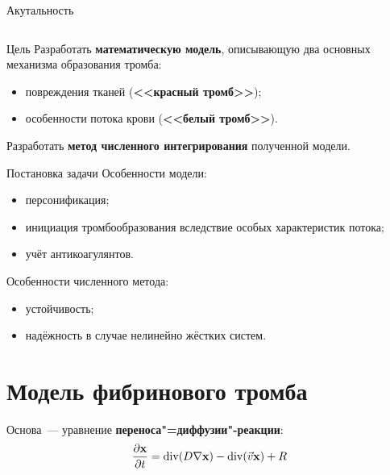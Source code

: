 \documentclass[
    14pt,
    xcolor=dvipsnames,
    aspectratio=169
]{beamer}
\begin{document}
\begin{frame}{Акутальность}
\begin{columns}[T]
\begin{column}{0.5\textwidth}
        \end{column}
    \end{columns}
\end{frame}

\begin{frame}{Цель}
    Разработать \textbf{математическую модель}, описывающую два основных механизма образования тромба:
    \begin{itemize}
        \item повреждения тканей (\textbf{<<красный тромб>>});
        \item особенности потока крови (\textbf{<<белый тромб>>}).
    \end{itemize}

    Разработать \textbf{метод численного интегрирования} полученной модели.
\end{frame}

\begin{frame}{Постановка задачи}
    Особенности модели:
    \begin{itemize}
        \item персонификация;
        \item инициация тромбообразования вследствие особых характеристик потока;
        \item учёт антикоагулянтов.
    \end{itemize}

    Особенности численного метода:
    \begin{itemize}
        \item устойчивость;
        \item надёжность в случае нелинейно жёстких систем.
    \end{itemize}
\end{frame}

\section{Модель фибринового тромба}

\begin{frame}{\secname}
    Основа~--- уравнение \textbf{переноса"=диффузии"-реакции}:
    \[
        \frac{\partial \mathbf{x}}{\partial t} = \mathrm{div} (D \nabla \mathbf{x}) - \mathrm{div} (\vec{v} \mathbf{x}) + R
    \]
\end{frame}
\end{document}
